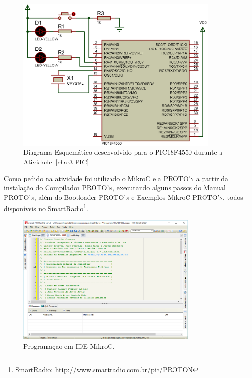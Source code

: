 \documentclass[
	12pt,				%
	openright,			%
  oneside,     %
	a4paper,			%
	english,			%
	french,				%
	spanish,			%
	brazil				%
	]{abntex2}
\begin{document}
\begin{figure}[ht]
  \centering
  \caption{\label{fig:Atividade-03-05-Schematic-01}Diagrama Esquemático desenvolvido para o PIC18F4550 durante a Atividade~\ref{cha:3-PIC}.}
  \includegraphics[width=0.9\textwidth]{images/Atividade03/Atividade-03-05-Schematic-01-recortado.png}
\end{figure}

Como pedido na atividade foi utilizado o MikroC e a \textsc{PROTO'n} a partir da instalação do Compilador \textsc{PROTO'n}, executando alguns passos do Manual \textsc{PROTO'n}, além do Bootloader \textsc{PROTO'n} e Exemplos-MikroC-\textsc{PROTO'n}, todos disponíveis no SmartRadio\footnote{SmartRadio: \url{http://www.smartradio.com.br/pic/PROTON}}.

\begin{figure}[!ht]
  \centering
  \caption{\label{fig:cha-3-mikroC-Pro00}Programação em IDE MikroC.}
  \includegraphics[width=0.8\textwidth]{images/Atividade03/mikroC-PRO00.png}
\end{figure}
\end{document}
